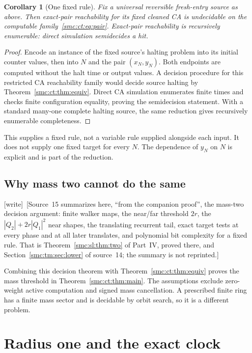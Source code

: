 \documentclass[11pt,letterpaper]{article}
\numberwithin{equation}{section}
\newtheorem{corollary}[theorem]{Corollary}
\theoremstyle{definition}
\theoremstyle{remark}
\newcommand{\wtag}{\textup{[write]}}
\begin{document}
\begin{corollary}[One fixed rule]\label{smc:ct:cor:onerule}
Fix a universal reversible fresh-entry source as above. Then exact-pair reachability for its fixed cleaned CA is undecidable on the computable family~\eqref{smc:ct:eq:pair}. Exact-pair reachability is recursively enumerable: direct simulation semidecides a hit.
\end{corollary}
\begin{proof}
Encode an instance of the fixed source's halting problem into its initial counter values, then into $N$ and the pair $(x_N,y_N)$. Both endpoints are computed without the halt time or output values. A decision procedure for this restricted CA reachability family would decide source halting by Theorem~\ref{smc:ct:thm:equiv}. Direct CA simulation enumerates finite times and checks finite configuration equality, proving the semidecision statement. With a standard many-one complete halting source, the same reduction gives recursively enumerable completeness.
\end{proof}

This supplies a fixed rule, not a variable rule supplied alongside each input. It does not supply one fixed target for every $N$. The dependence of $y_N$ on $N$ is explicit and is part of the reduction.

\subsection{Why mass two cannot do the same}

\wtag\ [Source~15 summarizes here, ``from the companion proof'', the mass-two decision argument: finite walker maps, the near/far threshold $2r$, the $|Q_2|+2r|Q_1|^2$ near shapes, the translating recurrent tail, exact target tests at every phase and at all later translates, and polynomial bit complexity for a fixed rule. That is Theorem~\ref{smc:sl:thm:two} of Part~IV, proved there, and Section~\ref{smc:tm:sec:lower} of source~14; the summary is not reprinted.]

Combining this decision theorem with Theorem~\ref{smc:ct:thm:equiv} proves the mass threshold in Theorem~\ref{smc:ct:thm:main}. The assumptions exclude zero-weight active computation and signed mass cancellation. A prescribed finite ring has a finite mass sector and is decidable by orbit search, so it is a different problem.

\section{Radius one and the exact clock}\label{smc:ct:sec:clock}
\end{document}
